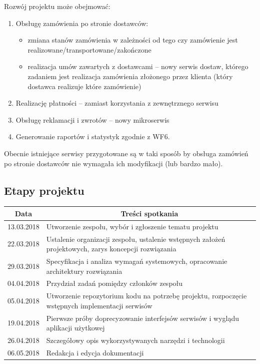 \documentclass[11pt,a4paper,twoside]{article}
\begin{document}
Rozwój projektu może obejmować:
\begin{enumerate}
\item Obsługę zamówienia po stronie dostawców:
\begin{itemize}
\item zmiana stanów zamówienia w zależności od tego czy zamówienie jest realizowane/transportowane/zakończone
\item realizacja umów zawartych z dostawcami -- nowy serwis dostaw, którego zadaniem jest realizacja zamówienia złożonego przez klienta (który dostawca realizuje które zamówienie)
\end{itemize}
\item Realizację płatności -- zamiast korzystania z zewnętrznego serwisu
\item Obsługę reklamacji i zwrotów -- nowy mikroserwis
\item Generowanie raportów i statystyk zgodnie z WF6.
\end{enumerate}

Obecnie istniejące serwisy przygotowane są w taki sposób by obsługa zamówień po stronie dostawców nie wymagała ich modyfikacji (lub bardzo mało).


\subsection{Etapy projektu}
\begin{table}[ht]
\label{etapyProjektu}
\centering
\begin{tabularx}{\textwidth}{|l|X|}
\hline
 \multicolumn{1}{|c|}{Data} & \multicolumn{1}{c|}{Treści spotkania} \\\hline
 13.03.2018 & Utworzenie zespołu, wybór i zgłoszenie tematu projektu \\\hline
 22.03.2018 & Ustalenie organizacji zespołu, ustalenie wstępnych założeń projektowych, zarys koncepcji rozwiązania \\\hline
 29.03.2018 & Specyfikacja i analiza wymagań systemowych, opracowanie architektury rozwiązania \\\hline
 04.04.2018 & Przydział zadań pomiędzy członków zespołu \\\hline
 05.04.2018 & Utworzenie repozytorium kodu na potrzebę projektu, rozpoczęcie wstępnych implementacji serwisów \\\hline
 19.04.2018 & Pierwsze próby doprecyzowanie interfejsów serwisów i wyglądu aplikacji użytkowej \\\hline
 26.04.2018 & Szczegółowy opis wykorzystywanych narzędzi i technologii \\\hline
 06.05.2018 & Redakcja i edycja dokumentacji \\\hline
\end{tabularx}
\end{table}
\end{document}
